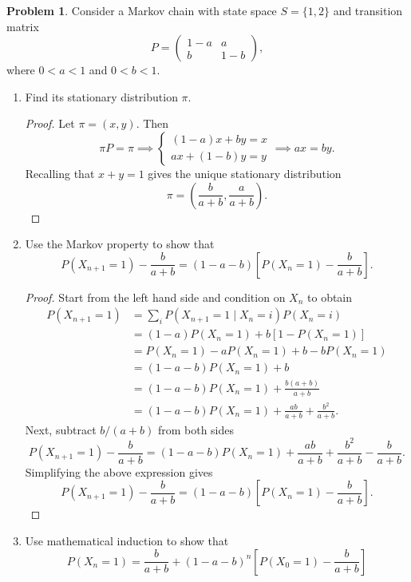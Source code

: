 \documentclass[oneside,reqno]{amsart}
\theoremstyle{definition}
\newtheorem{prob}{Problem}
\begin{document}
\begin{prob}
Consider a Markov chain with state space $S=\{1,2\}$ and transition matrix 
\[
	P = \begin{pmatrix}
		1-a & a \\
		b & 1-b
	\end{pmatrix},
\]
where $0<a<1$ and $0<b<1$. 
\end{prob}

\begin{enumerate}
\item
Find its stationary distribution $\pi$. 
\begin{proof}
Let $\pi = (x,y)$. Then 
\[
	\pi P = \pi 
	\implies 
	\begin{cases}
		(1-a)x + by = x \\
		a x + (1-b)y = y
	\end{cases}
	\implies 
	ax = by. 
\]
Recalling that $x+y = 1$ gives the unique stationary distribution 
\[
	\pi = \left(\frac{b}{a+b},\frac{a}{a+b}\right).
\]
\end{proof}

\item
Use the Markov property to show that 
\[
	P(X_{n+1} = 1) - \frac{b}{a+b} = (1-a-b)\left[P(X_n = 1)- \frac{b}{a+b}\right].
\]

\begin{proof}
Start from the left hand side and condition on $X_n$ to obtain 
\begin{align*}
	P(X_{n+1} = 1) &= \sum_i  P(X_{n+1} = 1 \mid X_n = i) P(X_n = i) \\
						    &= (1-a) P(X_n=1) + b[1-P(X_n=1)] \\
						    &= P(X_n = 1) - aP(X_n=1) + b - bP(X_n=1) \\
						    &= (1-a-b)P(X_n=1) + b \\
						    &= (1-a-b)P(X_n=1) + \frac{b(a+b)}{a+b} \\
						    &= (1-a-b)P(X_n=1) + \frac{ab}{a+b} + \frac{b^2}{a+b}.
\end{align*}
Next, subtract $b/(a+b)$ from both sides 
\[
	P(X_{n+1} = 1) -\frac{b}{a+b} = (1-a-b)P(X_n=1) + \frac{ab}{a+b} + \frac{b^2}{a+b} - \frac{b}{a+b}.
\]
Simplifying the above expression gives
\[
	P(X_{n+1} = 1) - \frac{b}{a+b} = (1-a-b)\left[P(X_n = 1)- \frac{b}{a+b}\right].
\]
\end{proof}

\item
Use mathematical induction to show that 
\[
	P(X_n = 1) = \frac{b}{a+b} + (1-a-b)^n \left[P(X_0 = 1)- \frac{b}{a+b}\right]
\]


\end{enumerate}
\end{document}

